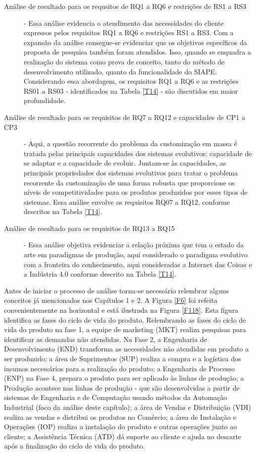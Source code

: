 		\begin{description}
		\item[Análise de resultado para os requsitos de RQ1 a RQ6 e restrições de RS1 a RS3] -
	Essa análise evidencia o atendimento das necessidades do cliente expressos pelos requisitos RQ1 a RQ6 e restrições RS1 a RS3. Com a expansão da análise consegue-se evidenciar que os objetivos específicos da proposta de pesquisa também foram atendidos. Isso,  quando se  enquadra a realização do sistema  como prova de conceito, tanto do método de desenvolvimento utilizado, quanto da funcionalidade do SIAPE. Considerando essa abordagem, os requisitos RQ1 a RQ6 e as restrições RS01 a RS03 - identificados na Tabela \ref{T14} - são discutidos em maior profundidade.\par
		
		\item[Análise de resultado para os requisitos de RQ7 a RQ12 e capacidades de CP1 a CP3] -
	Aqui, a questão recorrente do problema da customização em massa é tratada pelas principais capacidades dos sistemas evolutivos: capacidade de se adaptar e a capacidade de evoluir. Juntam-se às capacidades, as principais propriedades dos sistemas evolutivos para tratar o problema recorrente da customização de uma forma robusta que proporcione os níveis de competitividades para os produtos produzidos por esses tipos de sistemas. Essa análise envolve os requisitos RQ07 a RQ12, conforme descritos na Tabela \ref{T14}.
			
		\item[Análise de resultado para os requisitos de RQ13 a RQ15] -
	  Essa análise objetiva evidenciar a relação próxima que tem o estado da arte em paradigmas de produção, aqui considerado o paradigma evolutivo com a fronteira do conhecimento, aqui consideradas a Internet das Coisas e a Indústria 4.0 conforme descrito na Tabela \ref{T14}. 
		\end{description} 
			
	Antes de iniciar o processo de análise torna-se necessário relembrar alguns conceitos já mencionados nos Capítulos 1 e 2. A Figura \ref{F6} foi refeita convenientemente na horizontal e está ilustrada na Figura \ref{F118}. Esta figura identifica as fases do ciclo de vida do produto. Relembrando as fases do ciclo de vida do produto na fase 1, a equipe de marketing (MKT) realiza pesquisas para identificar as demandas não atendidas. Na Fase 2, a Engenharia de Desenvolvimento (END) transforma as necessidades não atendidas em produto a ser produzido; a área de Suprimentos (SUP) realiza a compra e a logística dos insumos necessários para a realização do produto; a Engenharia de Processo (ENP) na Fase 4, prepara o produto para ser aplicado às linhas de produção; a Produção acontece nas linhas de produção - que são desenvolvidas a partir de sistemas  de Engenharia e de Computação usando métodos da Automação Industrial (foco da análise deste capítulo); a área de Vendas e Distribuição (VDI) realiza as vendas e distribui os produtos no Comércio; a área de Instalação e Operações (IOP) realiza a instalação do produto e outras operações junto ao cliente;  a Assistência Técnica (ATD) dá suporte ao cliente e ajuda no descarte após a finalização do ciclo de vida do produto.  
	
